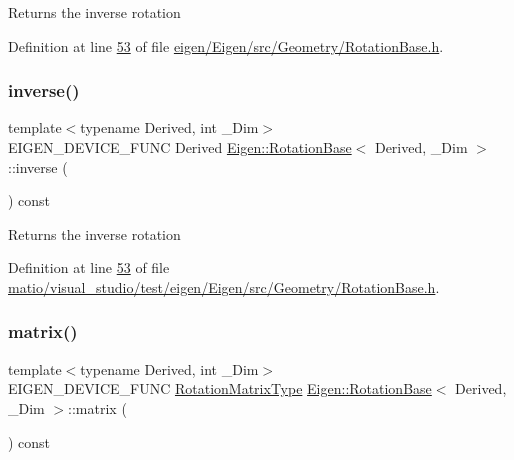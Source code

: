 \begin{DoxyReturn}{Returns}
the inverse rotation 
\end{DoxyReturn}


Definition at line \hyperlink{eigen_2_eigen_2src_2_geometry_2_rotation_base_8h_source_l00053}{53} of file \hyperlink{eigen_2_eigen_2src_2_geometry_2_rotation_base_8h_source}{eigen/\+Eigen/src/\+Geometry/\+Rotation\+Base.\+h}.

\mbox{\label{class_eigen_1_1_rotation_base_a2835ea92940986b4220cf47538a6bc41}} 
\subsubsection{\texorpdfstring{inverse()}{inverse()}\hspace{0.1cm}{\footnotesize\ttfamily [2/2]}}
{\footnotesize\ttfamily template$<$typename Derived, int \+\_\+\+Dim$>$ \\
E\+I\+G\+E\+N\+\_\+\+D\+E\+V\+I\+C\+E\+\_\+\+F\+U\+NC Derived \hyperlink{class_eigen_1_1_rotation_base}{Eigen\+::\+Rotation\+Base}$<$ Derived, \+\_\+\+Dim $>$\+::inverse (\begin{DoxyParamCaption}{ }\end{DoxyParamCaption}) const\hspace{0.3cm}{\ttfamily [inline]}}

\begin{DoxyReturn}{Returns}
the inverse rotation 
\end{DoxyReturn}


Definition at line \hyperlink{matio_2visual__studio_2test_2eigen_2_eigen_2src_2_geometry_2_rotation_base_8h_source_l00053}{53} of file \hyperlink{matio_2visual__studio_2test_2eigen_2_eigen_2src_2_geometry_2_rotation_base_8h_source}{matio/visual\+\_\+studio/test/eigen/\+Eigen/src/\+Geometry/\+Rotation\+Base.\+h}.

\mbox{\label{class_eigen_1_1_rotation_base_a14ce23df5f0b2593a466f8130fe6bac9}} 
\subsubsection{\texorpdfstring{matrix()}{matrix()}\hspace{0.1cm}{\footnotesize\ttfamily [1/2]}}
{\footnotesize\ttfamily template$<$typename Derived, int \+\_\+\+Dim$>$ \\
E\+I\+G\+E\+N\+\_\+\+D\+E\+V\+I\+C\+E\+\_\+\+F\+U\+NC \hyperlink{class_eigen_1_1_rotation_base_a83602509674c9d635551998460342951}{Rotation\+Matrix\+Type} \hyperlink{class_eigen_1_1_rotation_base}{Eigen\+::\+Rotation\+Base}$<$ Derived, \+\_\+\+Dim $>$\+::matrix (\begin{DoxyParamCaption}{ }\end{DoxyParamCaption}) const\hspace{0.3cm}{\ttfamily [inline]}}

